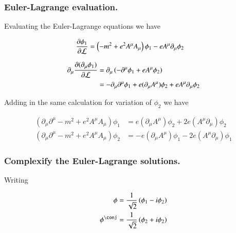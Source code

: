 \documentclass{article}
\begin{document}
\subsubsection{ Euler-Lagrange evaluation. }

Evaluating the Euler-Lagrange equations we have

\begin{align*}
\frac{\partial{\phi_1}}{\partial {\mathcal{L}}} &= \left( -m^2 + e^2 A^\mu A_\mu \right) \phi_1 - e A^\mu \partial_\mu \phi_2 
\end{align*}

\begin{align*}
\partial_\mu \frac{\partial{(\partial_\mu \phi_1)}}{\partial {\mathcal{L}}} 
&=
\partial_\mu \left( -\partial^\mu \phi_1 + e A^\mu \phi_2 \right) \\
&=
-\partial_\mu \partial^\mu \phi_1 
+ e (\partial_\mu A^\mu) \phi_2 
+ e A^\mu \partial_\mu \phi_2 
\\
\end{align*}

Adding in the same calculation for variation of $\phi_2$ we have

\begin{align*}
\left( \partial_\mu \partial^\mu -m^2 + e^2 A^\mu A_\mu \right) \phi_1 &= e (\partial_\mu A^\mu) \phi_2 + 2 e (A^\mu \partial_\mu) \phi_2  \\
\left( \partial_\mu \partial^\mu -m^2 + e^2 A^\mu A_\mu \right) \phi_2 &= -e (\partial_\mu A^\mu) \phi_1 - 2 e (A^\mu \partial_\mu) \phi_1 
\end{align*}

%
\subsubsection{ Complexify the Euler-Lagrange solutions. }

Writing

\begin{align*}
\phi &= \inv{\sqrt{2}}\left( \phi_1 - i \phi_2 \right) \\
\phi^\conj &= \inv{\sqrt{2}}\left( \phi_2 + i \phi_2 \right) \\
\end{align*}
\end{document}
